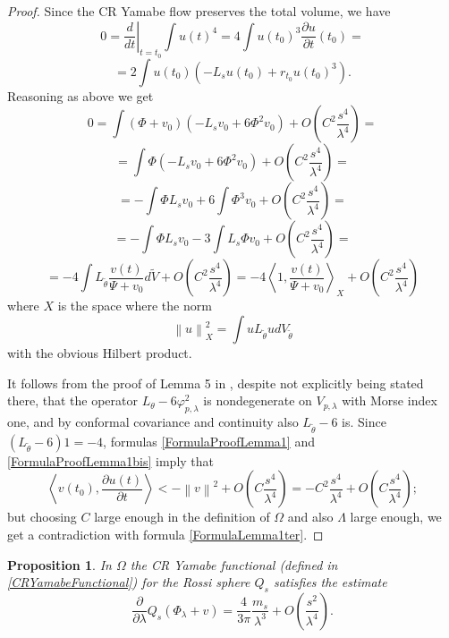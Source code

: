 \documentclass[a4paper,12pt]{amsart}
\newtheorem{proposizione}{Proposition}[section]
\renewcommand{\phi}{\varphi}
\newcommand{\de}{\partial}
\newcommand{\N}[1]{\left\lVert#1\right\rVert}
\newcommand{\bra}{\left\langle}
\newcommand{\ket}{\right\rangle}
\begin{document}
\begin{proof}
Since the CR Yamabe flow preserves the total volume, we have
$$0 = \left.\frac{d}{dt}\right|_{t=t_0}\int u(t)^4 = 4\int u(t_0)^3\frac{\de u}{\de t}(t_0)=$$
$$=2\int u(t_0)\left(-L_su(t_0) + r_{t_0}u(t_0)^3\right).$$
Reasoning as above we get
$$0= \int(\Phi+v_0)\left(-L_sv_0 + 6\Phi^2v_0\right) +O\left(C^2\frac{s^4}{\lambda^4}\right) =$$
$$= \int\Phi\left(-L_sv_0 + 6\Phi^2v_0\right) +O\left(C^2\frac{s^4}{\lambda^4}\right) =$$
$$= -\int\Phi L_sv_0 + 6\int\Phi^3v_0 +O\left(C^2\frac{s^4}{\lambda^4}\right) =$$
$$= -\int\Phi L_sv_0 -3\int L_s\Phi v_0 +O\left(C^2\frac{s^4}{\lambda^4}\right) =$$
\begin{equation}\label{FormulaProofLemma1bis}
 =-4\int L_{\widetilde{\theta}}\frac{v(t)}{\Psi+v_0}d\widetilde{V} +O\left(C^2\frac{s^4}{\lambda^4}\right)=-4\bra 1,\frac{v(t)}{\Psi+v_0}\ket_{X} +O\left(C^2\frac{s^4}{\lambda^4}\right)
\end{equation}
where $X$ is the space where the norm
$$\N{u}_X^2 = \int uL_{\widetilde{\theta}}udV_{\widetilde{\theta}}$$
with the obvious Hilbert product.

It follows from the proof of Lemma 5 in \cite{MU}, despite not explicitly being stated there, that the operator $L_{\theta}-6\phi_{p,\lambda}^2$ is nondegenerate on $V_{p,\lambda}$ with Morse index one, and by conformal covariance and continuity also $L_{\widetilde{\theta}}-6$ is. Since $(L_{\widetilde{\theta}}-6)1 = -4$, formulas \eqref{FormulaProofLemma1} and \eqref{FormulaProofLemma1bis} imply that
$$\bra v(t_0),\frac{\de u(t)}{\de t}\ket< -\N{v}^2 + O\left(C\frac{s^4}{\lambda^4}\right) = -C^2\frac{s^4}{\lambda^4} + O\left(C\frac{s^4}{\lambda^4}\right);$$
but choosing $C$ large enough in the definition of $\Omega$ and also $\Lambda$ large enough, we get a contradiction with formula \eqref{FormulaLemma1ter}.
\end{proof}

\begin{proposizione}\label{GradientEstimate}
 In $\Omega$ the CR Yamabe functional (defined in \eqref{CRYamabeFunctional}) for the Rossi sphere $Q_s$ satisfies the estimate
 $$\frac{\de}{\de\lambda}Q_s(\Phi_\lambda +v) = \frac{4}{3\pi}\frac{m_s}{\lambda^3} + O\left(\frac{s^2}{\lambda^4}\right).$$
\end{proposizione}
\end{document}
